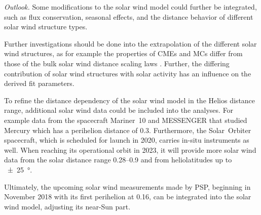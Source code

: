 \bigskip

\noindent \textit{Outlook.}
Some modifications to the solar wind model could further be integrated, such as flux conservation, seasonal effects, and the distance behavior of different solar wind structure types.

Further investigations should be done into the extrapolation of the different solar wind structures, as for example the properties of CMEs and MCs differ from those of the bulk solar wind distance scaling laws \citep{Bothmer1998}. Further, the differing contribution of solar wind structures with solar activity has an influence on the derived fit parameters.

To refine the distance dependency of the solar wind model in the Helios distance range, additional solar wind data could be included into the analyses. For example data from the spacecraft Mariner~10 and MESSENGER that studied Mercury which has a perihelion distance of \SI{0.3}{\au}.
Furthermore, the Solar~Orbiter spacecraft, which is scheduled for launch in 2020, carries in-situ instruments as well. When reaching its operational orbit in 2023, it will provide more solar wind data from the solar distance range \SIrange{0.28}{0.9}{\au} and from heliolatitudes up to \SI{+-25}{\degree}.

Ultimately, the upcoming solar wind measurements made by PSP, beginning in November 2018 with its first perihelion at \SI{0.16}{\au}, can be integrated into the solar wind model, adjusting its near-Sun part.




